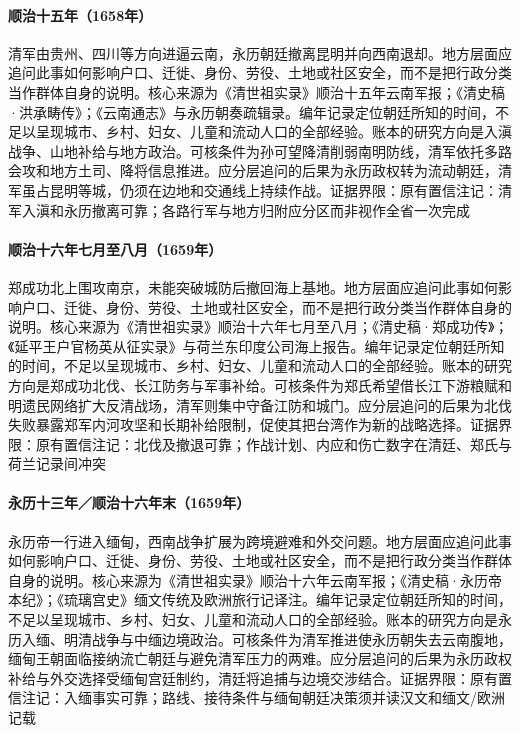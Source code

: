 \hypertarget{social:EQ-1658-QING-YUNNAN}{}\paragraph{顺治十五年（1658年）}清军由贵州、四川等方向进逼云南，永历朝廷撤离昆明并向西南退却。地方层面应追问此事如何影响户口、迁徙、身份、劳役、土地或社区安全，而不是把行政分类当作群体自身的说明。核心来源为《清世祖实录》顺治十五年云南军报；《清史稿·洪承畴传》；《云南通志》与永历朝奏疏辑录。编年记录定位朝廷所知的时间，不足以呈现城市、乡村、妇女、儿童和流动人口的全部经验。账本的研究方向是入滇战争、山地补给与地方政治。可核条件为孙可望降清削弱南明防线，清军依托多路会攻和地方土司、降将信息推进。应分层追问的后果为永历政权转为流动朝廷，清军虽占昆明等城，仍须在边地和交通线上持续作战。证据界限：原有置信注记：清军入滇和永历撤离可靠；各路行军与地方归附应分区而非视作全省一次完成
\hypertarget{social:EQ-1659-NANJING-EXPEDITION}{}\paragraph{顺治十六年七月至八月（1659年）}郑成功北上围攻南京，未能突破城防后撤回海上基地。地方层面应追问此事如何影响户口、迁徙、身份、劳役、土地或社区安全，而不是把行政分类当作群体自身的说明。核心来源为《清世祖实录》顺治十六年七月至八月；《清史稿·郑成功传》；《延平王户官杨英从征实录》与荷兰东印度公司海上报告。编年记录定位朝廷所知的时间，不足以呈现城市、乡村、妇女、儿童和流动人口的全部经验。账本的研究方向是郑成功北伐、长江防务与军事补给。可核条件为郑氏希望借长江下游粮赋和明遗民网络扩大反清战场，清军则集中守备江防和城门。应分层追问的后果为北伐失败暴露郑军内河攻坚和长期补给限制，促使其把台湾作为新的战略选择。证据界限：原有置信注记：北伐及撤退可靠；作战计划、内应和伤亡数字在清廷、郑氏与荷兰记录间冲突
\hypertarget{social:EQ-1659-YONGLI-MYANMAR}{}\paragraph{永历十三年／顺治十六年末（1659年）}永历帝一行进入缅甸，西南战争扩展为跨境避难和外交问题。地方层面应追问此事如何影响户口、迁徙、身份、劳役、土地或社区安全，而不是把行政分类当作群体自身的说明。核心来源为《清世祖实录》顺治十六年云南军报；《清史稿·永历帝本纪》；《琉璃宫史》缅文传统及欧洲旅行记译注。编年记录定位朝廷所知的时间，不足以呈现城市、乡村、妇女、儿童和流动人口的全部经验。账本的研究方向是永历入缅、明清战争与中缅边境政治。可核条件为清军推进使永历朝失去云南腹地，缅甸王朝面临接纳流亡朝廷与避免清军压力的两难。应分层追问的后果为永历政权补给与外交选择受缅甸宫廷制约，清廷将追捕与边境交涉结合。证据界限：原有置信注记：入缅事实可靠；路线、接待条件与缅甸朝廷决策须并读汉文和缅文/欧洲记载
